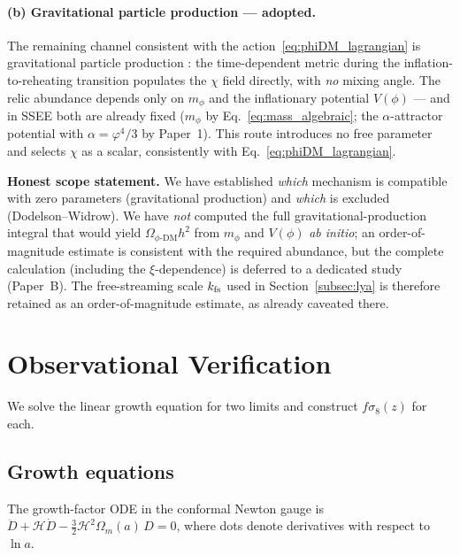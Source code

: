 \documentclass[12pt,a4paper]{article}
\newcommand{\phiDM}{\phi\text{-DM}}
\newcommand{\kfs}{k_{\rm fs}}
\newcommand{\mphi}{m_\phi}
\newcommand{\fsig}{f\sigma_8}
\begin{document}
\paragraph{(b) Gravitational particle production --- adopted.}
The remaining channel consistent with the action~\eqref{eq:phiDM_lagrangian}
is gravitational particle production \citep{Parker1968,ChungKolbRiotto1998}:
the time-dependent metric during the inflation-to-reheating transition
populates the $\chi$ field directly, with \emph{no} mixing angle.  The relic
abundance depends only on $\mphi$ and the inflationary potential
$V(\phi)$ --- and in SSEE both are already fixed
($\mphi$ by Eq.~\eqref{eq:mass_algebraic}; the $\alpha$-attractor potential
with $\alpha = \varphi^4/3$ by Paper~1).  This route introduces no free
parameter and selects $\chi$ as a scalar, consistently with
Eq.~\eqref{eq:phiDM_lagrangian}.

\medskip\noindent
\textbf{Honest scope statement.}  We have established \emph{which} mechanism
is compatible with zero parameters (gravitational production) and \emph{which}
is excluded (Dodelson--Widrow).  We have \emph{not} computed the full
gravitational-production integral that would yield $\Omega_{\phiDM}h^2$ from
$\mphi$ and $V(\phi)$ \emph{ab initio}; an order-of-magnitude estimate is
consistent with the required abundance, but the complete calculation
(including the $\xi$-dependence) is deferred to a dedicated study (Paper~B).
The free-streaming scale $\kfs$ used in Section~\ref{subsec:lya} is therefore
retained as an order-of-magnitude estimate, as already caveated there.

\section{Observational Verification}
\label{sec:verification}

We solve the linear growth equation for two limits and construct $\fsig(z)$
for each.

\subsection{Growth equations}
\label{subsec:growth}

The growth-factor ODE in the conformal Newton gauge is
$\ddot{D} + \mathcal{H}\dot{D} - \tfrac{3}{2}\mathcal{H}^2\Omega_m(a)\,D = 0$,
where dots denote derivatives with respect to $\ln a$.
\end{document}
